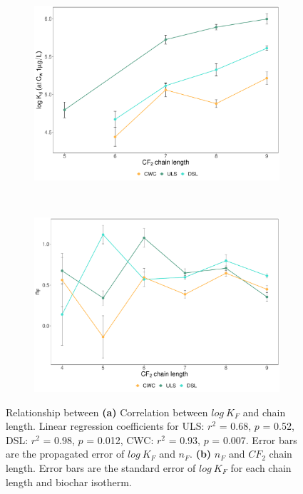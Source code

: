\begin{figure}[htb]
    \centering
    \begin{subfigure}[t]{0.45\textwidth}
        \centering
        \includegraphics[width=\textwidth]{R/figs/chain_length_Kd1ugL_plot.pdf}
        \caption{}
        \label{subfig:chainlength}
    \end{subfigure}%
    ~ 
    \begin{subfigure}[t]{0.45\textwidth}
        \centering
        \includegraphics[width=\textwidth]{R/figs/n_KF.pdf}
        \caption{}
        \label{subfig:n}
    \end{subfigure}
    \label{fig:chain_length_n}
    \caption{Relationship between \textbf{(a)} Correlation between $log~K_F$ and chain length. Linear regression coefficients for ULS: $r^2$ = 0.68, $p$ = 0.52, DSL: $r^2$ = 0.98, $p$ = 0.012, CWC: $r^2$ = 0.93, $p$ = 0.007. Error bars are the propagated error of $log~K_F$ and $n_F$. \textbf{(b)} $n_F$ and $CF_2$ chain length. Error bars are the standard error of $log~K_F$ for each chain length and biochar isotherm.}
\end{figure}


